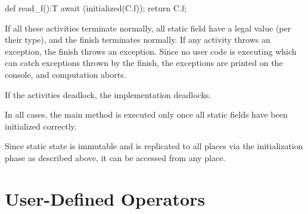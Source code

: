\begin{xten}
def read_f():T {
   await (initialized(C.f));
   return C.f;
}
\end{xten}
 

If all these activities terminate normally, all static field have a
legal value (per their type), and the finish terminates normally. If
any activity throws an exception, the finish throws an
exception. Since no user code is executing which can catch exceptions
thrown by the finish, the exceptions are printed on the console, and
computation aborts.

If the activities deadlock, the implementation deadlocks.

In all cases, the main method is executed only once all static fields
have been initialized correctly.

Since static state is immutable and is replicated to all places via 
the initialization phase as described above, it can be accessed from
any place.


\section{User-Defined Operators}

